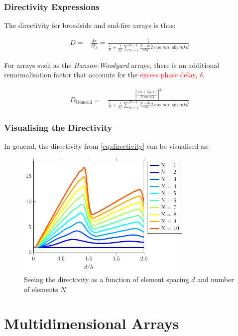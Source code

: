 \documentclass[10pt]{beamer}
\begin{document}
\begin{frame}
    \frametitle{Directivity Expressions}
The directivity for broadside and end-fire arrays is thus:

\begin{align*}
    D {}=& \frac{4\pi }{\Omega_A} = \frac{1}{\frac{1}{N}+\frac{1}{N^{2}} \sum_{m=1}^{N-1} \frac{N-m}{m k d} 2 \cos m \alpha \, \sin m k d}
\end{align*}

For arrays such as the \textit{Hanson-Woodyard} arrays, there is an additional renormalisation factor that accounts for the \textcolor{red}{excess phase delay, $\delta$},

\begin{align}
    D_{\text{General}} {}=&  \frac{\left|\frac{\sin (N \delta/2 )}{N \sin \delta/2 }\right|^2}{\frac{1}{N}+\frac{1}{N^{2}} \sum_{m=1}^{N-1} \frac{N-m}{m k d} 2 \cos m \alpha \, \sin m k d}
    \label{eq:directivity}
\end{align}
\end{frame}

\begin{frame}
    \frametitle{Visualising the Directivity}
In general, the directivity from \eqref{eq:directivity} can be visualised as:
\begin{figure}[h!]
    \centering
    \includegraphics[width=0.75\textwidth]{directivity.pdf}
    \caption{Seeing the directivity as a function of element spacing $d$ and number of elements $N$.}
    \label{fig:directivity}
\end{figure} 
\end{frame}

\section{Multidimensional Arrays}
\end{document}
